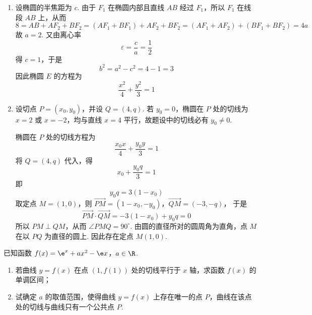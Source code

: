 \begin{solution}
\begin{enumerate}
\item 设椭圆的半焦距为 \(c\). 由于 \(F_{1}\) 在椭圆内部且直线 \(AB\) 经过 \(F_{1}\)，所以 \(F_{1}\) 在线段 \(AB\) 上，从而
\[
8=AB+AF_{2}+BF_{2}
=(AF_{1}+BF_{1})+AF_{2}+BF_{2}
=(AF_{1}+AF_{2})+(BF_{1}+BF_{2})
=4a
\]
故 \(a=2\). 又由离心率
\[
\varepsilon=\frac{c}{a}=\frac{1}{2}
\]
得 \(c=1\)，于是
\[
b^{2}=a^{2}-c^{2}=4-1=3
\]
因此椭圆 \(E\) 的方程为
\[
\frac{x^{2}}{4}+\frac{y^{2}}{3}=1
\]

\item 设切点 \(P=(x_{0},y_{0})\)，并设 \(Q=(4,q)\). 若 \(y_{0}=0\)，椭圆在 \(P\) 处的切线为 \(x=2\) 或 \(x=-2\)，均与直线 \(x=4\) 平行，故题设中的切线必有 \(y_{0}\neq0\).

椭圆在 \(P\) 处的切线方程为
\[
\frac{x_{0}x}{4}+\frac{y_{0}y}{3}=1
\]
将 \(Q=(4,q)\) 代入，得
\[
x_{0}+\frac{y_{0}q}{3}=1
\]
即
\[
y_{0}q=3(1-x_{0})
\]
取定点 \(M=(1,0)\)，则
\(\overrightarrow{PM}=(1-x_{0},-y_{0})\)，\(\overrightarrow{QM}=(-3,-q)\)，
于是
\[
\overrightarrow{PM}\cdot\overrightarrow{QM}
=-3(1-x_{0})+y_{0}q=0
\]
所以 \(PM\perp QM\)，从而 \(\angle PMQ=90^{\circ}\). 由圆的直径所对的圆周角为直角，点 \(M\) 在以 \(PQ\) 为直径的圆上. 因此存在定点 \(M(1,0)\).
\end{enumerate}
\end{solution}

\FloatBarrier

\begin{problem}
已知函数 \(f(x) = \e^{x} + ax^{2} - \e x\)，\(a \in \R\).

\begin{enumerate}
\item 若曲线 \(y = f(x)\) 在点 \((1,f(1))\) 处的切线平行于 \(x\) 轴，求函数 \(f(x)\) 的单调区间；
\item 试确定 \(a\) 的取值范围，使得曲线 \(y = f(x)\) 上存在唯一的点 \(P\)，曲线在该点处的切线与曲线只有一个公共点 \(P\).
\end{enumerate}
\end{problem}

